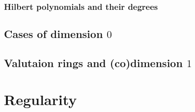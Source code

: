             \subsubsection{Hilbert polynomials and their degrees}
        
        \subsection{Cases of dimension \texorpdfstring{$0$}{}}
        
        \subsection{Valutaion rings and (co)dimension \texorpdfstring{$1$}{}}
    
    \section{Regularity}
